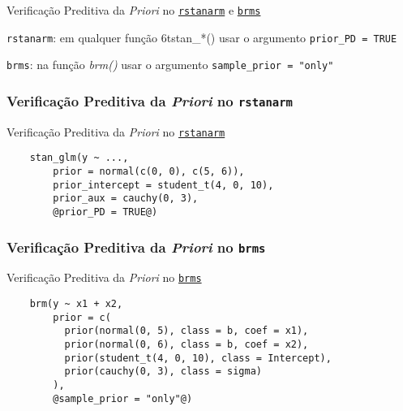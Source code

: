 \begin{frame}{Verificação Preditiva da \textit{Priori} no \href{http://mc-stan.org/rstanarm/}{\texttt{rstanarm}} e \href{https://paul-buerkner.github.io/brms/}{\texttt{brms}}}
    \begin{vfilleditems}
        \item \texttt{rstanarm}: em qualquer função \text6t{stan\_*()} usar o argumento \texttt{prior\_PD = TRUE}
        \item \texttt{brms}: na função \textit{brm()} usar o argumento \texttt{sample\_prior = "only"}
    \end{vfilleditems}
\end{frame}

\subsubsection{Verificação Preditiva da \textit{Priori} no \texttt{rstanarm}}
\begin{frame}[fragile]{Verificação Preditiva da \textit{Priori} no \href{http://mc-stan.org/rstanarm/}{\texttt{rstanarm}}}
    \begin{lstlisting}
    stan_glm(y ~ ...,
        prior = normal(c(0, 0), c(5, 6)),
        prior_intercept = student_t(4, 0, 10),
        prior_aux = cauchy(0, 3),
        @prior_PD = TRUE@)
    \end{lstlisting}
\end{frame}
\subsubsection{Verificação Preditiva da \textit{Priori} no \texttt{brms}}
\begin{frame}[fragile]{Verificação Preditiva da \textit{Priori} no \href{https://paul-buerkner.github.io/brms/}{\texttt{brms}}}
    \begin{lstlisting}
    brm(y ~ x1 + x2,
        prior = c(
          prior(normal(0, 5), class = b, coef = x1),
          prior(normal(0, 6), class = b, coef = x2),
          prior(student_t(4, 0, 10), class = Intercept),
          prior(cauchy(0, 3), class = sigma)
        ),
        @sample_prior = "only"@)
    \end{lstlisting}
\end{frame}

